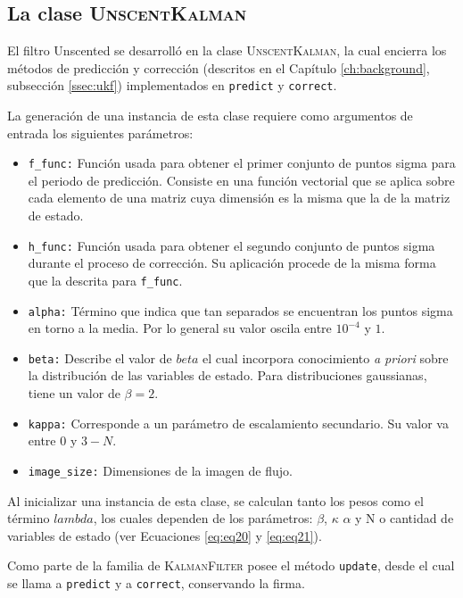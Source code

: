 \subsection{La clase \textsc{UnscentKalman}}

El filtro Unscented se desarroll\'o en la clase \textsc{UnscentKalman}, la cual encierra los m\'etodos de predicci\'on y correcci\'on (descritos en el Cap\'itulo \ref{ch:background}, subsecci\'on \ref{ssec:ukf}) implementados en \texttt{predict} y \texttt{correct}.
\bigskip

La generaci\'on de una instancia de esta clase requiere como argumentos de entrada los siguientes par\'ametros:

\begin{itemize}
\item \texttt{f\_func:} Funci\'on usada para obtener el primer conjunto de puntos sigma para el periodo de predicci\'on. Consiste en una funci\'on vectorial que se aplica sobre cada elemento de una matriz cuya dimensi\'on es la misma que la de la matriz de estado.
\item \texttt{h\_func:} Funci\'on usada para obtener el segundo conjunto de puntos sigma durante el proceso de correcci\'on. Su aplicaci\'on procede de la misma forma que la descrita para \texttt{f\_func}. 
\item \texttt{alpha:} T\'ermino que indica que tan separados se encuentran los puntos sigma en torno a la media. Por lo general su valor oscila entre $10^{-4}$ y $1$. 
\item \texttt{beta:} Describe el valor de $beta$ el cual incorpora conocimiento \textit{a priori} sobre la distribuci\'on de las variables de estado. Para distribuciones gaussianas, tiene un valor de $\beta=2$. 
\item \texttt{kappa:} Corresponde a un par\'ametro de escalamiento secundario. Su valor va entre $0$ y $3-N$.
\item \texttt{image\_size:} Dimensiones de la imagen de flujo.
\end{itemize}

Al inicializar una instancia de esta clase, se calculan tanto los pesos como el t\'ermino $lambda$, los cuales dependen de los par\'ametros: $\beta$, $\kappa$ $\alpha$ y N o cantidad de variables de estado (ver Ecuaciones \ref{eq:eq20} y \ref{eq:eq21}).
\bigskip

Como parte de la familia de \textsc{KalmanFilter} posee el m\'etodo \texttt{update}, desde el cual se llama a \texttt{predict} y a \texttt{correct}, conservando la firma.
 
